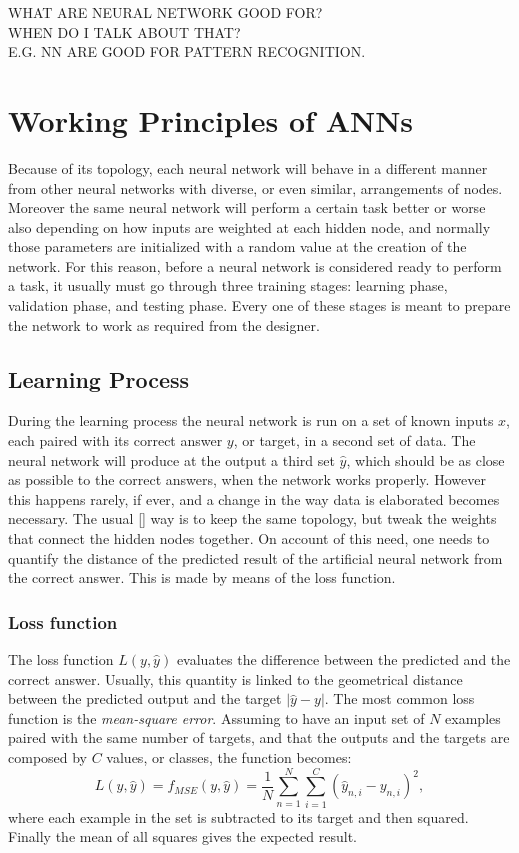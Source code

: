 \noindent\uppercase{\large{What are neural network good for?\\ when do i talk about that?\\ e.g. NN are good for pattern recognition.}}
\normalsize

\section{Working Principles of ANNs}
\label{sec:Working_Principles_of_ANNs}
Because of its topology, each neural network will behave in a different manner from other neural networks with diverse, or even similar, arrangements of nodes.
Moreover the same neural network will perform a certain task better or worse also depending on how inputs are weighted at each hidden node, and normally those parameters are initialized with a random value at the creation of the network.
For this reason, before a neural network is considered ready to perform a task, it usually must go through three training stages: learning phase, validation phase, and testing phase.
Every one of these stages is meant to prepare the network to work as required from the designer.

\subsection{Learning Process}
\label{ssec:Learning_Process}
During the learning process the neural network is run on a set of known inputs $x$, each paired with its correct answer $y$, or target, in a second set of data.
The neural network will produce at the output a third set $\hat{y}$, which should be as close as possible to the correct answers, when the network works properly.
However this happens rarely, if ever, and a change in the way data is elaborated becomes necessary.
The usual \ref{} way is to keep the same topology, but tweak the weights that connect the hidden nodes together.
On account of this need, one needs to quantify the distance of the predicted result of the artificial neural network from the correct answer.
This is made by means of the loss function.

\subsubsection{Loss function}
\label{sssec:Loss_function}
The loss function $L(y, \hat{y})$ evaluates the difference between the predicted and the correct answer.
Usually, this quantity is linked to the geometrical distance between the predicted output and the target $\left| \hat{y}-y \right|$.
The most common loss function is the \textit{mean-square error}.
Assuming to have an input set of $N$ examples paired with the same number of targets, and that the outputs and the targets are composed by $C$ values, or classes, the function becomes:
\begin{equation}
	L(y, \hat{y}) = f_{MSE}(y, \hat{y}) = \frac{1}{N} \sum_{n=1}^N \sum_{i=1}^C \left( \hat{y}_{n,i} - y_{n,i} \right)^2,
\end{equation}
where each example in the set is subtracted to its target and then squared.
Finally the mean of all squares gives the expected result.

